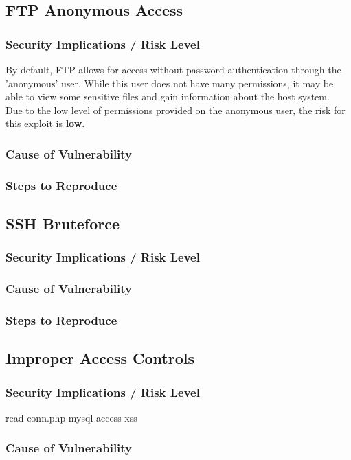 \documentclass{report}
\begin{document}
\subsection{FTP Anonymous Access}
\subsubsection{Security Implications / Risk Level}
By default, FTP allows for access without password authentication through the 'anonymous' user. While this user does not have many permissions, it may be able to view some sensitive files and gain information about the host system.\\
Due to the low level of permissions provided on the anonymous user, the risk for this exploit is \textbf{low}.
\subsubsection{Cause of Vulnerability}
\subsubsection{Steps to Reproduce}

\subsection{SSH Bruteforce}
\subsubsection{Security Implications / Risk Level}
\subsubsection{Cause of Vulnerability}

\subsubsection{Steps to Reproduce}
\subsection{Improper Access Controls}
\subsubsection{Security Implications / Risk Level}
	read conn.php
	mysql access
	xss
\subsubsection{Cause of Vulnerability}
\end{document}

